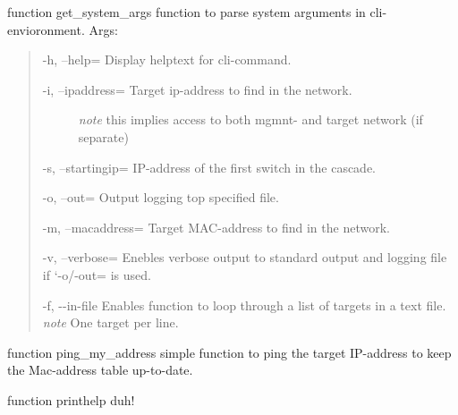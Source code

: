 \documentclass[letterpaper,10pt,english]{sphinxmanual}
\begin{document}
\begin{fulllineitems}

\begin{fulllineitems}
\label{Trace_Functions:Trace_Functions.Tracefunctions.get_system_args}
function get\_system\_args
function to parse system arguments in cli-envioronment.
Args:
\begin{quote}

-h, --help=           Display helptext for cli-command.
\begin{description}
\item[{-i, --ipaddress=      Target ip-address to find in the network.}] \leavevmode
\emph{note} this implies access to both mgmnt- and target network (if separate)

\end{description}

-s, --startingip=     IP-address of the first switch in the cascade.

-o, --out=            Output logging top specified file.

-m, --macaddress=     Target MAC-address to find in the network.

-v, --verbose=        Enebles verbose output to standard output and logging file if `-o/-out= is used.
\begin{optionlist}{3cm}
\item [-f, -{-}in-file]  
Enables function to loop through a list of targets in a text file.
\emph{note} One target per line.
\end{optionlist}
\end{quote}

\end{fulllineitems}


\begin{fulllineitems}
\label{Trace_Functions:Trace_Functions.Tracefunctions.ping_my_address}
function ping\_my\_address
simple function to ping the target IP-address to keep the Mac-address table up-to-date.

\end{fulllineitems}


\begin{fulllineitems}
\label{Trace_Functions:Trace_Functions.Tracefunctions.printhelp}
function printhelp
duh!

\end{fulllineitems}


\end{fulllineitems}
\end{document}
